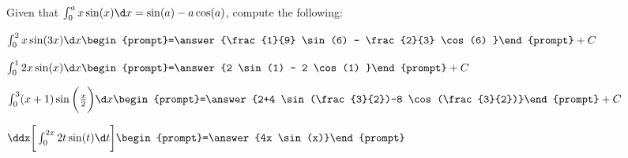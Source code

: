 \documentclass{ximera}
\author{Jim Talamo}
\begin{document}
\begin{exercise}
Given that $ \int_0^a x \sin(x) \d x = \sin(a)-a \cos(a)$, compute the following:



$ \int_0^2 x \sin(3x) \d x \begin{prompt}=\answer{\frac{1}{9} \sin(6) - \frac{2}{3} \cos(6) }\end{prompt}+C$


$ \int_0^1 2x \sin(x) \d x \begin{prompt}=\answer{2 \sin(1) - 2 \cos(1) }\end{prompt}+C$

$ \int_0^3 (x+1) \sin\bigg(\frac{x}{2}\bigg) \d x \begin{prompt}=\answer{2+4 \sin(\frac{3}{2})-8 \cos(\frac{3}{2})}\end{prompt}+C$

$\ddx \bigg[ \int_0^{2x} 2t \sin(t) \d t \bigg] \begin{prompt}=\answer{4x \sin(x)}\end{prompt}$

\end{exercise}
\end{document}
